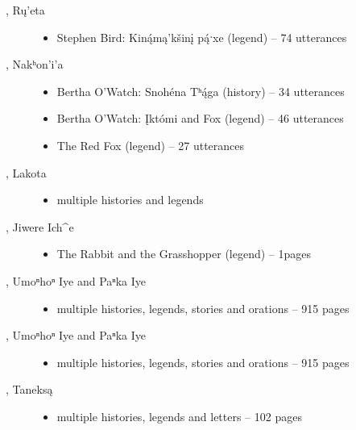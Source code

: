 \documentclass[output=paper]{LSP/langsci}
\begin{document}
\begin{description}

\item[\citet{Carter1991}, Rų’eta]\hfill
\begin{itemize}
\item Stephen Bird: Kin\'ąmą’kšinį p\'ąˑxe (legend) -- 74 utterances
\end{itemize}

\item[\citet{Cumberland2005}, Nakʰon’i’a]\hfill
\begin{itemize}
\item Bertha O’Watch: Snohéna Tʰ\'ąga (history) -- 34 utterances
\item Bertha O’Watch: Įktómi and Fox (legend) -- 46 utterances
\item The Red Fox (legend) -- 27 utterances
\end{itemize}

\item[\citet{Deloria1932}, Lakota]\hfill
\begin{itemize}
\item multiple histories and legends
\end{itemize}

\item[\citet{Dorsey1880}, Jiwere Ich\^{}e]\hfill
\begin{itemize}
\item The Rabbit and the Grasshopper (legend) -- 1\textonehalf{}pages
\end{itemize}

\item[\citet{Dorsey1890}, Umoⁿhoⁿ Iye and Paⁿka Iye]\hfill
\begin{itemize}
\item multiple histories, legends, stories and orations -- 915 pages
\end{itemize}

\item[\citet{Dorsey1891}, Umoⁿhoⁿ Iye and Paⁿka Iye]\hfill
\begin{itemize}
\item multiple histories, legends, stories and orations -- 915 pages
\end{itemize}

\item[\citet{DorseySwanton1912}, Taneksą]\hfill
\begin{itemize}
\item multiple histories, legends and letters -- 102 pages
\end{itemize}


\end{description}
\end{document}
